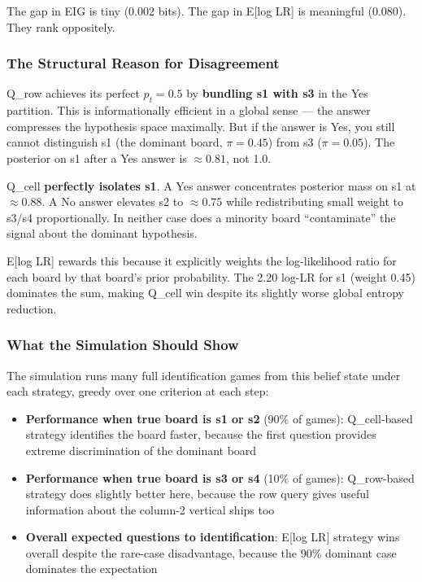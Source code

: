 \documentclass[
]{article}
\providecommand{\tightlist}{%
  \setlength{\itemsep}{0pt}\setlength{\parskip}{0pt}}
\begin{document}
The gap in EIG is tiny (0.002 bits). The gap in E{[}log LR{]} is
meaningful (0.080). They rank oppositely.

\subsubsection{The Structural Reason for
Disagreement}\label{the-structural-reason-for-disagreement}

Q\_row achieves its perfect \(p_t = 0.5\) by \textbf{bundling s1 with
s3} in the Yes partition. This is informationally efficient in a global
sense --- the answer compresses the hypothesis space maximally. But if
the answer is Yes, you still cannot distinguish s1 (the dominant board,
\(\pi = 0.45\)) from s3 (\(\pi = 0.05\)). The posterior on s1 after a
Yes answer is \(\approx 0.81\), not 1.0.

Q\_cell \textbf{perfectly isolates s1}. A Yes answer concentrates
posterior mass on s1 at \(\approx 0.88\). A No answer elevates s2 to
\(\approx 0.75\) while redistributing small weight to s3/s4
proportionally. In neither case does a minority board ``contaminate''
the signal about the dominant hypothesis.

E{[}log LR{]} rewards this because it explicitly weights the
log-likelihood ratio for each board by that board's prior probability.
The 2.20 log-LR for s1 (weight 0.45) dominates the sum, making Q\_cell
win despite its slightly worse global entropy reduction.

\subsubsection{What the Simulation Should
Show}\label{what-the-simulation-should-show}

The simulation runs many full identification games from this belief
state under each strategy, greedy over one criterion at each step:

\begin{itemize}
\tightlist
\item
  \textbf{Performance when true board is s1 or s2} (90\% of games):
  Q\_cell-based strategy identifies the board faster, because the first
  question provides extreme discrimination of the dominant board
\item
  \textbf{Performance when true board is s3 or s4} (10\% of games):
  Q\_row-based strategy does slightly better here, because the row query
  gives useful information about the column-2 vertical ships too
\item
  \textbf{Overall expected questions to identification}: E{[}log LR{]}
  strategy wins overall despite the rare-case disadvantage, because the
  90\% dominant case dominates the expectation
\end{itemize}
\end{document}
